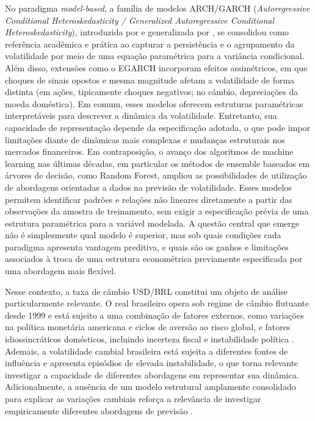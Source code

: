 No paradigma \textit{model-based}, a família de modelos ARCH/GARCH (\textit{Autoregressive Conditional Heteroskedasticity / Generalized Autoregressive Conditional Heteroskedasticity}), introduzida por \textcite{engle1982autoregressive} e generalizada 
por \textcite{bollerslev1986generalized}, se consolidou como referência acadêmica e prática ao capturar a persistência e o agrupamento da volatilidade por meio de 
uma equação paramétrica para a variância condicional. Além disso, extensões como o EGARCH \cite{nelson1991conditional} incorporam efeitos assimétricos, em que choques 
de sinais opostos e mesma magnitude afetam a volatilidade de forma distinta (em ações, tipicamente choques negativos; no câmbio, depreciações da moeda doméstica). Em comum, esses modelos oferecem estruturas paramétricas 
interpretáveis para descrever a dinâmica da volatilidade. Entretanto, sua capacidade de representação depende da especificação adotada, o que pode impor limitações diante de dinâmicas mais complexas e mudanças estruturais nos mercados financeiros.
Em contraposição, o avanço dos algoritmos de machine learning nas últimas décadas, em particular os métodos de ensemble baseados em árvores de decisão, como Random Forest, ampliou as possibilidades de utilização de abordagens orientadas a dados 
na previsão de volatilidade. Esses modelos permitem identificar padrões e relações não lineares diretamente a partir das observações da amostra de treinamento, sem exigir a especificação prévia de uma estrutura paramétrica para a variável modelada. 
A questão central que emerge não é simplesmente qual modelo é superior, mas sob quais condições cada paradigma apresenta vantagem preditiva, e quais são os ganhos e limitações associados à troca de uma estrutura econométrica previamente especificada por uma abordagem mais flexível.

Nesse contexto, a taxa de câmbio USD/BRL constitui um objeto de análise particularmente relevante. O real brasileiro opera sob regime de câmbio flutuante desde 1999 e está sujeito 
a uma combinação de fatores externos, como variações na política monetária americana e ciclos de aversão ao risco global, e fatores idiossincráticos domésticos, incluindo incerteza 
fiscal e instabilidade política \cite{bacen2021volatilidade}. Ademais, a volatilidade cambial brasileira está sujeita a diferentes fontes de influência e apresenta episódios de elevada instabilidade, o que torna relevante investigar a capacidade de diferentes abordagens em representar sua dinâmica. Adicionalmente, a ausência de um modelo estrutural amplamente consolidado para explicar as variações cambiais reforça a relevância de investigar empiricamente diferentes abordagens de previsão \cite{bacen2021volatilidade,campani2018forecasting}.


